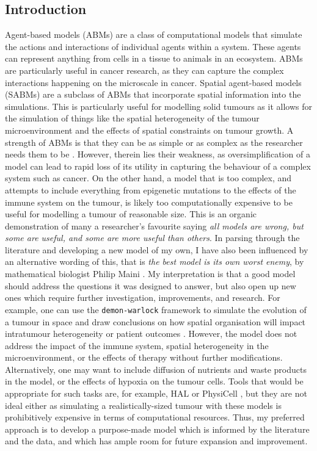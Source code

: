 \subsection{Introduction}
Agent-based models (ABMs) are a class of computational models that simulate the actions and interactions of individual
agents within a system. These agents can represent anything from cells in a tissue to animals in an ecosystem. ABMs
are particularly useful in cancer research, as they can capture the complex interactions happening on the microscale in
cancer. Spatial agent-based models (SABMs) are a subclass of ABMs that incorporate spatial information into the
simulations. This is particularly useful for modelling solid tumours as it allows for the simulation of things like
the spatial heterogeneity of the tumour microenvironment and the effects of spatial constraints on tumour growth.
A strength of ABMs is that they can be as simple or as complex as the researcher needs them to be \cite{colyer_seven-step_2023}.
However, therein lies their weakness, as oversimplification of a model can lead to rapid loss of its utility in
capturing the behaviour of a complex system such as cancer. On the other hand, a model that is too complex, and
attempts to include everything from epigenetic mutations to the effects of the immune system on the tumour, is likely
too computationally expensive to be useful for modelling a tumour of reasonable size. This is an organic demonstration
of many a researcher's favourite saying \textit{all models are wrong, but some are useful, and some are more useful
than others}. In parsing through the literature and developing a new model of my own, I have also been influenced
by an alternative wording of this, that is \textit{the best model is its own worst enemy}, by mathematical biologist Philip
Maini \cite{maini_talk_2023}. My
interpretation is that a good model should address the questions it was designed to answer, but also open up new
ones which require further investigation, improvements, and research. For example, one can use the \texttt{demon-warlock}
framework \cite{bak_warlock_2023} to simulate the evolution of a tumour in space and draw conclusions on how
spatial organisation will impact intratumour heterogeneity or patient outcomes \cite{noble_when_2020, noble_spatial_2022}.
However, the model does not address the impact of the immune system, spatial heterogeneity in the microenvironment,
or the effects of therapy without further modifications. Alternatively, one may want to include diffusion of
nutrients and waste products in the model, or the effects of hypoxia on the tumour cells. Tools that would be
appropriate for such tasks are, for example, HAL \cite{bravo_hybrid_2020} or PhysiCell \cite{ghaffarizadeh_physicell_2018},
but they are not ideal either as simulating a realistically-sized tumour with these models is prohibitively expensive
in terms of computational resources. Thus, my preferred approach is to develop a purpose-made model which is
informed by the literature and the data, and which has ample room for future expansion and improvement.

